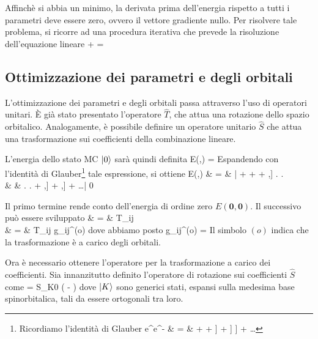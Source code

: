 Affinch\`e si abbia un minimo, la derivata prima dell'energia rispetto 
a tutti i parametri deve essere zero, ovvero il vettore gradiente nullo.
Per risolvere tale problema, si ricorre ad una procedura iterativa 
che prevede la risoluzione dell'equazione lineare
\beq
{} +  =  
\eeq

\subsection{Ottimizzazione dei parametri e degli orbitali}

L'ottimizzazione dei parametri e degli orbitali passa attraverso l'uso
di operatori unitari. \`E gi\`a stato presentato l'operatore $\hat{T}$, 
che attua una rotazione dello spazio orbitalico. Analogamente,
\`e possibile definire un operatore unitario $\hat{S}$ che attua una
trasformazione sui coefficienti della combinazione lineare.

L'energia dello stato MC $\left| 0 \right\rangle$ sar\`a quindi definita
\beq
E(,) =
\eeq
Espandendo con l'identit\`a di Glauber\footnote{Ricordiamo l'identit\`a di Glauber 
\beqas
e^{}e^{-} & = &  +  +  \left[ \hat{A} , \left[ \hat{A} , \hat{B} \right]
\right] +  \left[ \hat{A} , \left[ \hat{A} , \left[ \hat{A} ,
\hat{B} \right] \right] \right] + \ldots
\eeqas
} tale espressione, si ottiene
\beqas
E(,) & = & \left{} \left| \ham +  
+  
+ \half \left[ \left[ \ham,\hat{T}\right],\right] \right. \right. \\
& & \left. \left. + \half \left[ \left[ \ham,\hat{S}\right],\right]
+ \left[ \left[ \ham,\hat{T}\right],\right]
+ \ldots \right| 0 \right\rangle
\eeqas

Il primo termine rende conto dell'energia di ordine zero
$E(\mathbf{0},\mathbf{0})$. Il successivo pu\`o essere sviluppato
\beqas
{} & = &  T_{ij}
 \\
%
& = &  T_{ij} g_{ij}^{(o)}
\eeqas
dove abbiamo posto
\beq
g_{ij}^{(o)} = 
\eeq
Il simbolo $(o)$ indica che la trasformazione \`e a carico degli
orbitali.

Ora \`e necessario ottenere l'operatore per la trasformazione a
carico dei coefficienti. Sia innanzitutto definito l'operatore di rotazione
sui coefficienti $\hat{S}$ come
\beq
{} =  S_{K0} \left( - 
\right)
\eeq
dove $\left| K \right\rangle$ sono generici stati, espansi sulla medesima base
spinorbitalica, tali da essere ortogonali tra loro.

